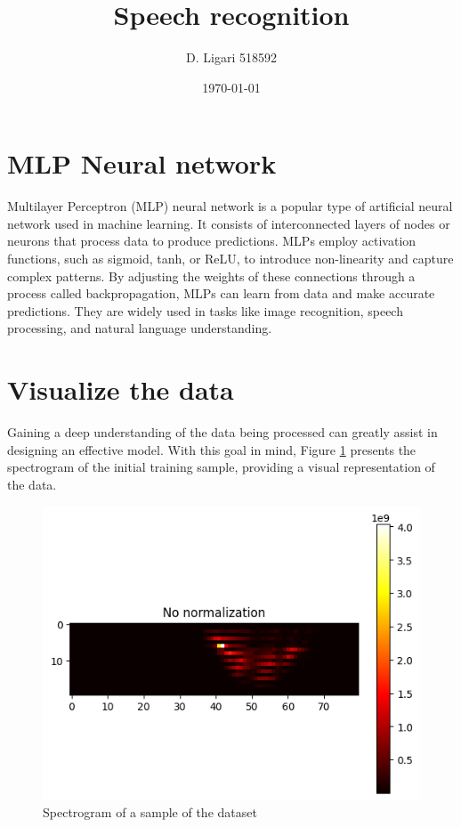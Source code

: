 \documentclass{class}
\title{Speech recognition}
\author[1]{D. Ligari 518592}
\affil[1]{Machine Learning course, University of Pavia, Department of Computer Engineering (Data Science), Pavia, Italy}
\date{\today}
\begin{document}
\maketitle
\thispagestyle{FirstPage}
\section{MLP Neural network}
Multilayer Perceptron (MLP) neural network is a popular type of artificial neural network used in machine learning.
It consists of interconnected layers of nodes or neurons that process data to produce predictions.
MLPs employ activation functions, such as sigmoid, tanh, or ReLU, to introduce non-linearity and capture complex patterns.
By adjusting the weights of these connections through a process called backpropagation, MLPs can learn from data and make accurate predictions.
They are widely used in tasks like image recognition, speech processing, and natural language understanding.

\section{Visualize the data}
Gaining a deep understanding of the data being processed can greatly assist in designing an effective model.
With this goal in mind, Figure \ref{fig-1} presents the spectrogram of the initial training sample, providing a visual representation of the data.

\begin{figure}[H]
  \centering
  \includegraphics[width=.6\columnwidth]{images/sample_spectrogram.png}
  \caption{Spectrogram of a sample of the dataset}
  \label{fig-1}
\end{figure}
\end{document}
